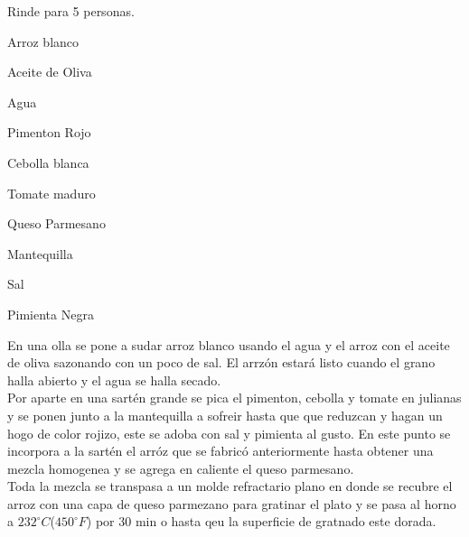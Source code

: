 
Rinde para 5 personas.


\begin{ingredientes}
\item Arroz blanco
\item Aceite de Oliva
\item Agua
\item Pimenton Rojo
\item Cebolla blanca
\item Tomate maduro
\item Queso Parmesano
\item Mantequilla
\item Sal
\item Pimienta Negra
\end{ingredientes}
\preparacion


En una olla se pone a sudar arroz blanco usando el agua y el arroz con el aceite de oliva sazonando con un poco de sal. El arrzón estará listo cuando el grano halla abierto y el agua se halla secado.\\
Por aparte en una sartén grande se pica el pimenton, cebolla y tomate en julianas y se ponen junto a la mantequilla a sofreir hasta que que reduzcan y hagan un hogo de color rojizo, este se adoba con sal y pimienta al gusto. En este punto se incorpora a la sartén el arróz que se fabricó anteriormente hasta obtener una mezcla homogenea y se agrega en caliente el queso parmesano.\\

Toda la mezcla se transpasa a un molde refractario plano en donde se recubre el arroz con una capa de queso parmezano para gratinar el plato y se pasa al horno a $232^{\circ}C$($450^{\circ}F$) por 30 min o hasta qeu la superficie de gratnado este dorada.
